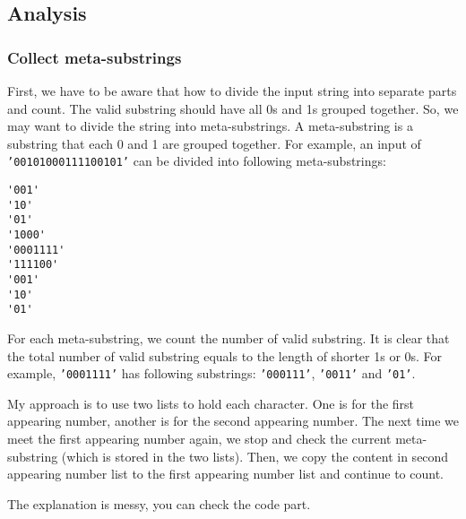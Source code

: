 \documentclass[12pt]{article}
\begin{document}
\subsection{Analysis}
\label{sec:orgc1cad87}
\subsubsection{Collect meta-substrings \label{orgada03b0}}
\label{sec:org9d5750e}
First, we have to be aware that how to divide the input string into separate parts and count. The valid substring should have all 0s and 1s grouped together. So, we may want to divide the string into meta-substrings. A meta-substring is a substring that each 0 and 1 are grouped together. For example, an input of \texttt{'00101000111100101'} can be divided into following meta-substrings:
\begin{verbatim}
'001'
'10'
'01'
'1000'
'0001111'
'111100'
'001'
'10'
'01'
\end{verbatim}
For each meta-substring, we count the number of valid substring. It is clear that the total number of valid substring equals to the length of shorter 1s or 0s. For example, \texttt{'0001111'} has following substrings: \texttt{'000111'}, \texttt{'0011'} and \texttt{'01'}.

My approach is to use two lists to hold each character. One is for the first appearing number, another is for the second appearing number. The next time we meet the first appearing number again, we stop and check the current meta-substring (which is stored in the two lists). Then, we copy the content in second appearing number list to the first appearing number list and continue to count.

The explanation is messy, you can check the code part.
\end{document}
